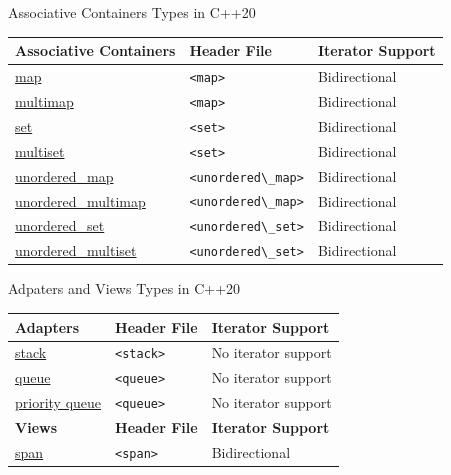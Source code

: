\documentclass[14pt,aspectratio=1610]{beamer}
\begin{document}
\begin{frame}{Associative Containers Types in C++20}
  \renewcommand{\arraystretch}{1.1}
  \begin{tabular}{l l l}
  \toprule
  \textbf{Associative Containers} & \textbf{Header File} & \textbf{Iterator Support}\\
  \midrule

    \href{https://en.cppreference.com/w/cpp/container/map}{map}
      & \lstinline{<map>} & Bidirectional\\
    \href{https://en.cppreference.com/w/cpp/container/multimap}{multimap}
      & \lstinline{<map>} & Bidirectional\\
    \href{https://en.cppreference.com/w/cpp/container/set}{set}
      & \lstinline{<set>} & Bidirectional\\
    \href{https://en.cppreference.com/w/cpp/container/multiset}{multiset}
      & \lstinline{<set>} & Bidirectional\\
  \midrule
    \href{https://en.cppreference.com/w/cpp/container/unordered_map}{unordered\_map}
      & \lstinline{<unordered\_map>} & Bidirectional\\
    \href{https://en.cppreference.com/w/cpp/container/unordered_multimap}{unordered\_multimap}
      & \lstinline{<unordered\_map>} & Bidirectional\\
    \href{https://en.cppreference.com/w/cpp/container/unordered_set}{unordered\_set}
      & \lstinline{<unordered\_set>} & Bidirectional\\
    \href{https://en.cppreference.com/w/cpp/container/unordered_multiset}{unordered\_multiset}
      & \lstinline{<unordered\_set>} & Bidirectional\\
  \bottomrule
\end{tabular}

\end{frame}


\begin{frame}{Adpaters and Views Types in C++20}
  \renewcommand{\arraystretch}{1.1}
  \begin{tabular}{l l l}
    \toprule
      \textbf{Adapters} & \textbf{Header File} & \textbf{Iterator Support}\\
    \midrule
      \href{https://en.cppreference.com/w/cpp/container/stack}{stack}
        & \lstinline{<stack>} & No iterator support\\
      \href{https://en.cppreference.com/w/cpp/container/queue}{queue}
        & \lstinline{<queue>} & No iterator support\\
      \href{https://en.cppreference.com/w/cpp/container/priority_queue}{priority queue}
        & \lstinline{<queue>} & No iterator support\\
    \midrule
      \textbf{Views} & \textbf{Header File} & \textbf{Iterator Support}\\
        \href{https://en.cppreference.com/w/cpp/container/span}{span}
        & \lstinline{<span>} & Bidirectional\\
  \bottomrule
  \end{tabular}
  
  \end{frame}
\end{document}
